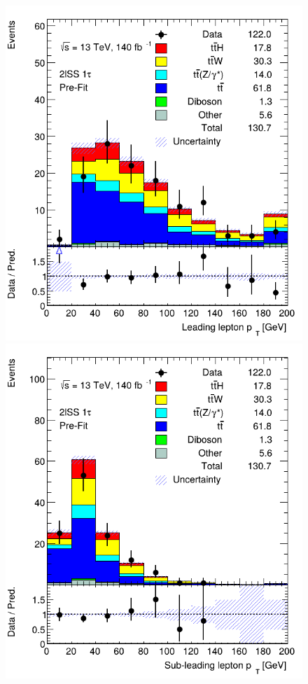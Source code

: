 \begin{figure}[ht!]
    \centering
    
    \includegraphics[scale=0.25]{res/AnalysisPlots/wData/lep-pt-0.png}
    \includegraphics[scale=0.25]{res/AnalysisPlots/wData/lep-pt-1.png}

\end{figure}
